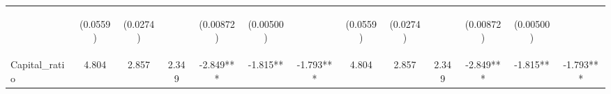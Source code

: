 \documentclass[]{article}
\begin{document}
\begin{center}
\begin{tabular}{lcccccccccccc}
\vspace{4pt} & \begin{footnotesize}(0.0559)\end{footnotesize} & \begin{footnotesize}(0.0274)\end{footnotesize} & \begin{footnotesize}\end{footnotesize} & \begin{footnotesize}(0.00872)\end{footnotesize} & \begin{footnotesize}(0.00500)\end{footnotesize} & \begin{footnotesize}\end{footnotesize} & \begin{footnotesize}(0.0559)\end{footnotesize} & \begin{footnotesize}(0.0274)\end{footnotesize} & \begin{footnotesize}\end{footnotesize} & \begin{footnotesize}(0.00872)\end{footnotesize} & \begin{footnotesize}(0.00500)\end{footnotesize} & \begin{footnotesize}\end{footnotesize} \\
Capital\_ratio & 4.804 & 2.857 & 2.349 & -2.849*** & -1.815** & -1.793*** & 4.804 & 2.857 & 2.349 & -2.849*** & -1.815** & -1.793*** \\

\end{tabular}
\end{center}
\end{document}
